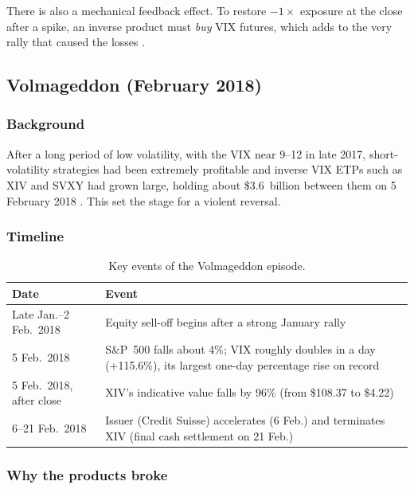 There is also a mechanical feedback effect. To restore $-1\times$ exposure at the close after a spike, an inverse product must \emph{buy} VIX futures, which adds to the very rally that caused the losses \cite{augustin}.

\subsection{Volmageddon (February 2018)}
\subsubsection{Background}

After a long period of low volatility, with the VIX near 9--12 in late 2017, short-volatility strategies had been extremely profitable and inverse VIX ETPs such as XIV and SVXY had grown large, holding about \$3.6~billion between them on 5 February 2018 \cite{bbgvol}. This set the stage for a violent reversal.

\subsubsection{Timeline}

\begin{table}[H]
\centering
\small
\begin{tabular}{@{}p{3.6cm}p{11cm}@{}}
\toprule
\textbf{Date} & \textbf{Event}\\
\midrule
Late Jan.--2 Feb.\ 2018 & Equity sell-off begins after a strong January rally\\
5 Feb.\ 2018 & S\&P~500 falls about 4\%; VIX roughly doubles in a day (+115.6\%), its largest one-day percentage rise on record\\
5 Feb.\ 2018, after close & XIV's indicative value falls by 96\% (from \$108.37 to \$4.22)\\
6--21 Feb.\ 2018 & Issuer (Credit Suisse) accelerates (6 Feb.) and terminates XIV (final cash settlement on 21 Feb.) \cite{csxiv}\\
\bottomrule
\end{tabular}
\caption{Key events of the Volmageddon episode.}
\label{tab:timeline}
\end{table}

\subsubsection{Why the products broke}

